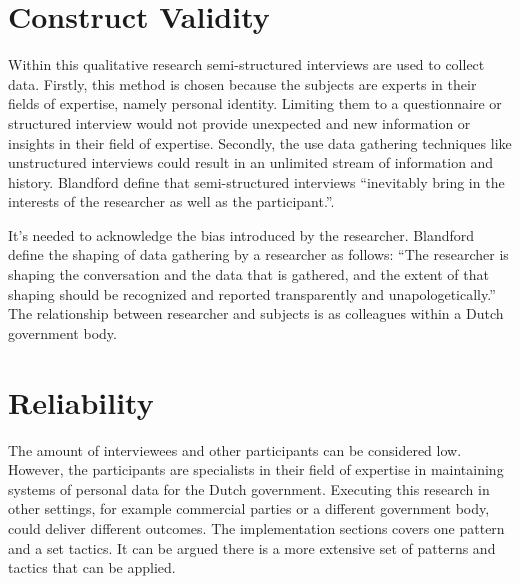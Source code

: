 
\section{Construct Validity}
Within this qualitative research semi-structured interviews are used to collect data. Firstly, this method is chosen because the subjects are experts in their fields of expertise, namely personal identity. Limiting them to a questionnaire or structured interview would not provide unexpected and new information or insights in their field of expertise. Secondly, the use data gathering techniques like unstructured interviews could result in an unlimited stream of information and history. Blandford \etal \cite{Blandford2016QualitativeHR} define that semi-structured interviews “inevitably bring in the interests of the researcher as well as the participant.”. 
\par
It’s needed to acknowledge the bias introduced by the researcher. Blandford \etal \cite{Blandford2016QualitativeHR} define the shaping of data gathering by a researcher as follows: “The researcher is shaping the conversation and the data that is gathered, and the extent of that shaping should be recognized and reported transparently and unapologetically.” The relationship between researcher and subjects is as colleagues within a Dutch government body.
\section{Reliability}
The amount of interviewees and other participants can be considered low. However, the participants are specialists in their field of expertise in maintaining systems of personal data for the Dutch government. Executing this research in other settings, for example commercial parties or a different government body, could deliver different outcomes.
The implementation sections covers one pattern and a set tactics. It can be argued there is a more extensive set of patterns and tactics that can be applied.

